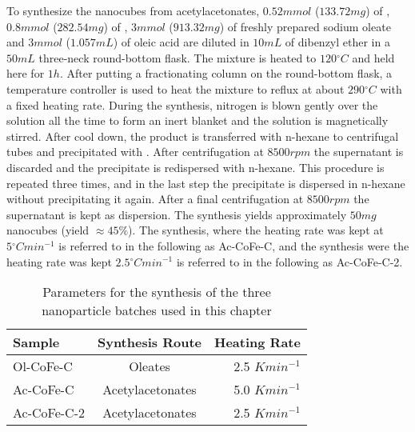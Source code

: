 \documentclass[\main/dresen_thesis.tex]{subfiles}
\begin{document}
    To synthesize the nanocubes from acetylacetonates, $0.52 \unit{mmol}$ ($133.72 \unit{mg}$) of  , $0.8 \unit{mmol}$ ($282.54 \unit{mg}$) of , $3 \unit{mmol}$ ($913.32 \unit{mg}$) of freshly prepared sodium oleate and $3 \unit{mmol}$ ($1.057 \unit{mL}$) of oleic acid are diluted in $10 \unit{mL}$ of dibenzyl ether in a $50 \unit{mL}$ three-neck round-bottom flask.
    The mixture is heated to $120 \unit{^\circ C}$ and held here for $1 \unit{h}$.
    After putting a fractionating column on the round-bottom flask, a temperature controller is used to heat the mixture to reflux at about $290 \unit{^\circ C}$ with a fixed heating rate.
    During the synthesis, nitrogen is blown gently over the solution all the time to form an inert blanket and the solution is magnetically stirred.
    After cool down, the product is transferred with n-hexane to centrifugal tubes and precipitated with .
    After centrifugation at $8500 \unit{rpm}$ the supernatant is discarded and the precipitate is redispersed with n-hexane.
    This procedure is repeated three times, and in the last step the precipitate is dispersed in n-hexane without precipitating it again.
    After a final centrifugation at $8500 \unit{rpm}$ the supernatant is kept as dispersion.
    The synthesis yields approximately $50 \unit{mg}$ nanocubes (yield $\approx 45 \%$).
    The synthesis, where the heating rate was kept at $5 \unit{^\circ C min^{-1}}$ is referred to in the following as Ac-CoFe-C, and the synthesis were the heating rate was kept $2.5 \unit{^\circ C min^{-1}}$ is referred to in the following as Ac-CoFe-C-2.


    \begin{table}[ht]
      \centering
      \caption{\label{tab:monolayers:synthesis:nanoparticles}Parameters for the synthesis of the three nanoparticle batches used in this chapter}
      \begin{tabular}{ l | c | r }
        \textbf{Sample} & \textbf{Synthesis Route} & \textbf{Heating Rate}\\
        \hline
        Ol-CoFe-C & Oleates & 2.5 $\unit{K min^{-1}}$\\
        Ac-CoFe-C & Acetylacetonates & 5.0 $\unit{K min^{-1}}$\\
        Ac-CoFe-C-2 & Acetylacetonates & 2.5 $\unit{K min^{-1}}$\\
        \hline
      \end{tabular}
    \end{table}
\end{document}
